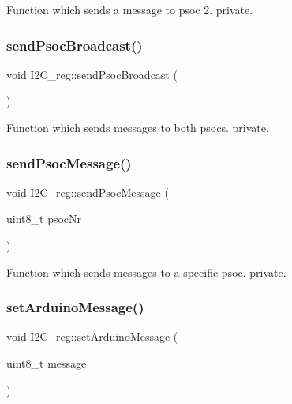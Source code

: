 Function which sends a message to psoc 2. private. 

\mbox{\label{class_i2_c__reg_acd34d2f4e7768e262772828f980b933b}} 
\subsubsection{\texorpdfstring{send\+Psoc\+Broadcast()}{sendPsocBroadcast()}}
{\footnotesize\ttfamily void I2\+C\+\_\+reg\+::send\+Psoc\+Broadcast (\begin{DoxyParamCaption}{ }\end{DoxyParamCaption})\hspace{0.3cm}{\ttfamily [private]}}



Function which sends messages to both psocs. private. 

\mbox{\label{class_i2_c__reg_ac69b2184dc49d8b097bebde346e56783}} 
\subsubsection{\texorpdfstring{send\+Psoc\+Message()}{sendPsocMessage()}}
{\footnotesize\ttfamily void I2\+C\+\_\+reg\+::send\+Psoc\+Message (\begin{DoxyParamCaption}\item[{uint8\+\_\+t}]{psoc\+Nr }\end{DoxyParamCaption})\hspace{0.3cm}{\ttfamily [private]}}



Function which sends messages to a specific psoc. private. 

\mbox{\label{class_i2_c__reg_accde84779d1a3a3290fb955c1269b66f}} 
\subsubsection{\texorpdfstring{set\+Arduino\+Message()}{setArduinoMessage()}}
{\footnotesize\ttfamily void I2\+C\+\_\+reg\+::set\+Arduino\+Message (\begin{DoxyParamCaption}\item[{uint8\+\_\+t}]{message }\end{DoxyParamCaption})}



